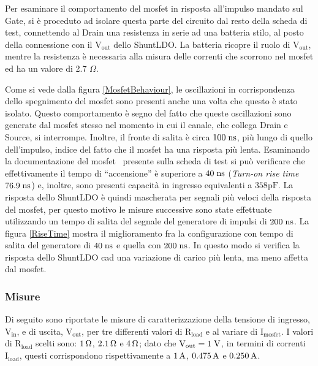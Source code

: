 Per esaminare il comportamento del mosfet in risposta all'impulso mandato sul Gate, si è proceduto ad isolare questa parte del circuito dal resto della scheda di test, connettendo al Drain una resistenza in serie ad una batteria stilo, al posto della connessione con il $\mathrm{V_{out}}$ dello ShuntLDO.
La batteria ricopre il ruolo di $\mathrm{V_{out}}$, mentre la resistenza è necessaria alla misura delle correnti che scorrono nel mosfet ed ha un valore di 2.7 $\Omega$. 


Come si vede dalla figura \ref{MosfetBehaviour}, le oscillazioni in corrispondenza dello spegnimento del mosfet sono presenti anche una volta che questo è stato isolato.
Questo comportamento è segno del fatto che queste oscillazioni sono generate dal mosfet stesso nel momento in cui il canale, che collega Drain e Source, si interrompe.
Inoltre, il fronte di salita è circa $100 \rm \; ns$, più lungo di quello dell'impulso, indice del fatto che il mosfet ha una risposta più lenta. %
Esaminando la documentazione del mosfet~\cite{MOSFET} presente sulla scheda di test 
si può verificare che effettivamente il tempo di ``accensione'' è superiore a $40 \rm \; ns$ (\textit{Turn-on rise time} $76.9 \rm \; ns$) e, inoltre, sono presenti capacità in ingresso equivalenti a $\mathrm{358 pF}$.
La risposta dello ShuntLDO è quindi mascherata per segnali più veloci della risposta del mosfet, per questo motivo le misure successive sono state effettuate utilizzando un tempo di salita del segnale del generatore di impulsi di $200 \rm \; ns$.
La figura \ref{RiseTime} mostra il miglioramento fra la configurazione con tempo di salita del generatore di $40 \rm \; ns$ e quella con $200 \rm \; ns$.
In questo modo si verifica la risposta dello ShuntLDO cad una variazione di carico più lenta, ma meno affetta dal mosfet.

\subsubsection{Misure}

Di seguito sono riportate le misure di caratterizzazione della tensione di ingresso, $\mathrm{V_{in}}$, e di uscita, $\mathrm{V_{out}}$, per tre differenti valori di $\mathrm{R_{load}}$ e al variare di $\mathrm{I_{mosfet}}$.
I valori di $\mathrm{R_{load}}$ scelti sono: $1 {\rm \, \Omega}$, $2.1 {\rm \, \Omega}$ e $4 {\rm \, \Omega}$; dato che $\mathrm{V_{out}=1 \rm \; V}$, in termini di correnti  $\mathrm{I_{load}}$, questi corrispondono rispettivamente a $1 \rm \, A$, $0.475 \rm \, A$ e $0.250 \rm \, A$.

